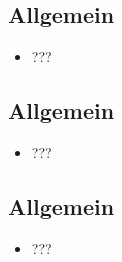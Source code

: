 \documentclass{article} %
\begin{document}
	\subsection{Allgemein}
	\begin{itemize}
		\item ???
	\end{itemize}
	\subsection{Allgemein}
	\begin{itemize}
		\item ???
	\end{itemize}
	\subsection{Allgemein}
	\begin{itemize}
		\item ???
	\end{itemize}
\end{document}
